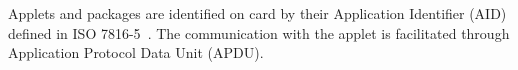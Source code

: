\documentclass{../llncs/llncs}
\begin{document}

Applets and packages are identified on card by their Application Identifier (AID) defined in ISO 7816-5~\cite{jcspecs31download}.
The communication with the applet is facilitated through Application Protocol Data Unit (APDU). 


\end{document}
